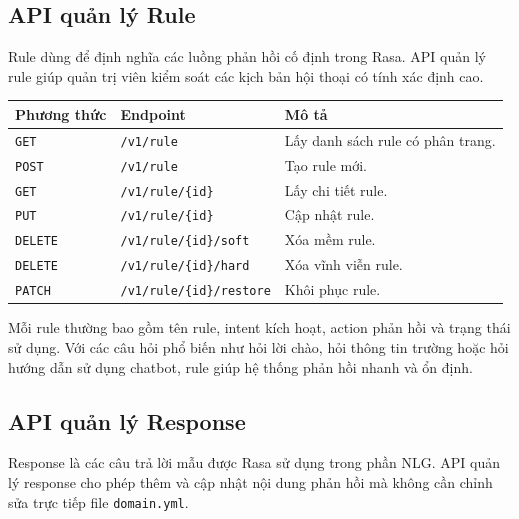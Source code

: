 \documentclass[12pt,a4paper]{report}
\begin{document}
\subsection{API quản lý Rule}

Rule dùng để định nghĩa các luồng phản hồi cố định trong Rasa. API quản lý rule giúp quản trị viên kiểm soát các kịch bản hội thoại có tính xác định cao.

\begin{longtable}{|p{3cm}|p{5cm}|p{7cm}|}
\hline
\textbf{Phương thức} & \textbf{Endpoint} & \textbf{Mô tả} \\
\hline
\texttt{GET} & \texttt{/v1/rule} & Lấy danh sách rule có phân trang. \\
\hline
\texttt{POST} & \texttt{/v1/rule} & Tạo rule mới. \\
\hline
\texttt{GET} & \texttt{/v1/rule/\{id\}} & Lấy chi tiết rule. \\
\hline
\texttt{PUT} & \texttt{/v1/rule/\{id\}} & Cập nhật rule. \\
\hline
\texttt{DELETE} & \texttt{/v1/rule/\{id\}/soft} & Xóa mềm rule. \\
\hline
\texttt{DELETE} & \texttt{/v1/rule/\{id\}/hard} & Xóa vĩnh viễn rule. \\
\hline
\texttt{PATCH} & \texttt{/v1/rule/\{id\}/restore} & Khôi phục rule. \\
\hline
\end{longtable}

Mỗi rule thường bao gồm tên rule, intent kích hoạt, action phản hồi và trạng thái sử dụng. Với các câu hỏi phổ biến như hỏi lời chào, hỏi thông tin trường hoặc hỏi hướng dẫn sử dụng chatbot, rule giúp hệ thống phản hồi nhanh và ổn định.

\subsection{API quản lý Response}

Response là các câu trả lời mẫu được Rasa sử dụng trong phần NLG. API quản lý response cho phép thêm và cập nhật nội dung phản hồi mà không cần chỉnh sửa trực tiếp file \texttt{domain.yml}.
\end{document}
